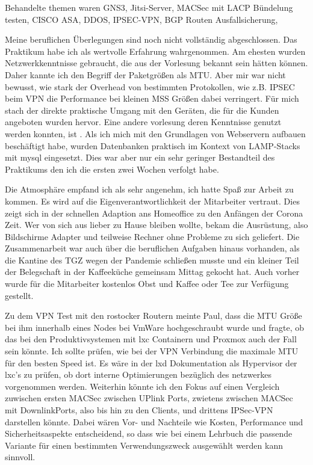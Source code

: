 \documentclass[english,runningheads,a4paper]{llncs}[2018/03/10]
\begin{document}
Behandelte themen waren GNS3, Jitsi-Server, MACSec mit LACP Bündelung testen, CISCO ASA, DDOS, IPSEC-VPN, BGP Routen Ausfallsicherung,

Meine beruflichen Überlegungen sind noch nicht vollständig abgeschlossen. Das Praktikum habe ich als wertvolle Erfahrung wahrgenommen.
Am ehesten wurden Netzwerkkenntnisse gebraucht, die aus der Vorlesung  bekannt sein hätten können. Daher kannte ich den Begriff der Paketgrößen als MTU. Aber mir war nicht bewusst, wie stark der Overhead von bestimmten Protokollen, wie z.B. IPSEC beim VPN die Performance bei kleinen MSS Größen dabei verringert. Für mich stach der direkte praktische Umgang mit den Geräten, die für die Kunden angeboten wurden hervor. 
Eine andere vorlesung deren Kenntnisse genutzt werden konnten, ist . Als ich mich mit den Grundlagen von Webservern aufbauen beschäftigt habe, wurden Datenbanken praktisch im Kontext von LAMP-Stacks mit mysql eingesetzt. Dies war aber nur ein sehr geringer Bestandteil des Praktikums den ich die ersten zwei Wochen verfolgt habe.

Die Atmosphäre empfand ich als sehr angenehm, ich hatte Spaß zur Arbeit zu kommen. Es wird auf die Eigenverantwortlichkeit der Mitarbeiter vertraut. Dies zeigt sich in der schnellen Adaption ans Homeoffice zu den Anfängen der Corona Zeit. Wer von sich aus lieber zu Hause bleiben wollte, bekam die Ausrüstung, also Bildschirme Adapter und teilweise Rechner ohne Probleme zu sich geliefert.
Die Zusammenarbeit war auch über die beruflichen Aufgaben hinaus vorhanden, als die Kantine des TGZ wegen der Pandemie schließen musste und ein kleiner Teil der Belegschaft in der Kaffeeküche gemeinsam Mittag gekocht hat. Auch vorher wurde für die Mitarbeiter kostenlos Obst und Kaffee oder Tee zur Verfügung gestellt.

Zu dem VPN Test mit den rostocker Routern meinte Paul, dass die MTU Größe bei ihm innerhalb eines Nodes bei VmWare hochgeschraubt wurde und fragte, ob das bei den Produktivsystemen mit lxc Containern und Proxmox auch der Fall sein könnte. Ich sollte prüfen, wie bei der VPN Verbindung die maximale MTU für den besten Speed ist. Es wäre in der lxd Dokumentation als Hypervisor der lxc's zu prüfen, ob dort interne Optimierungen bezüglich des netzwerkes vorgenommen werden.
Weiterhin könnte ich den Fokus auf einen Vergleich zuwischen ersten MACSec zwischen UPlink Ports, zwietens zwischen MACSec mit DownlinkPorts, also bis hin zu den Clients, und drittens IPSec-VPN darstellen könnte. Dabei wären Vor- und Nachteile wie Kosten, Performance und Sicherheitsaspekte entscheidend, so dass wie bei einem Lehrbuch die passende Variante für einen bestimmten Verwendungszweck ausgewählt werden kann sinnvoll.
\end{document}
